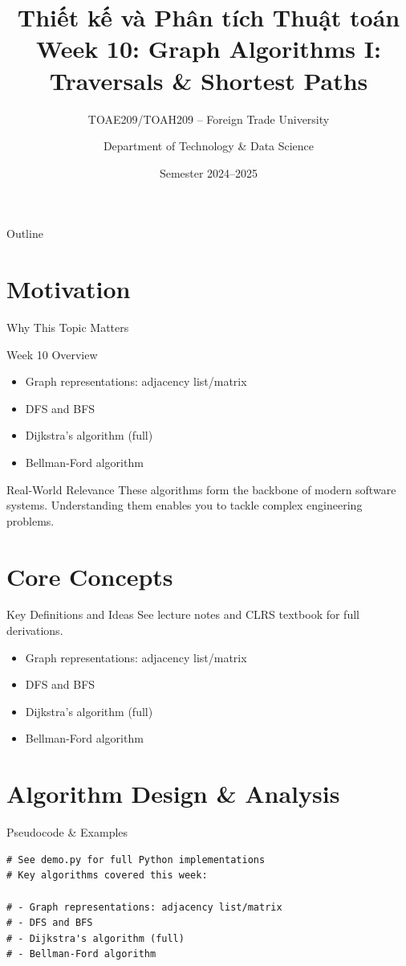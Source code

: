 \documentclass[aspectratio=169,xcolor=dvipsnames]{beamer}
\title[Algorithms -- Week 10]{\textbf{Thiết kế và Phân tích Thuật toán}\\
  \large Week 10: Graph Algorithms I: Traversals & Shortest Paths}
\subtitle{TOAE209/TOAH209 -- Foreign Trade University}
\author{Department of Technology \& Data Science}
\date{Semester 2024--2025}
\begin{document}
\begin{frame}\titlepage\end{frame}
\begin{frame}{Outline}\tableofcontents\end{frame}

\section{Motivation}
\begin{frame}{Why This Topic Matters}
  \begin{block}{Week 10 Overview}
    \begin{itemize}
    \item Graph representations: adjacency list/matrix
    \item DFS and BFS
    \item Dijkstra's algorithm (full)
    \item Bellman-Ford algorithm
    \end{itemize}
  \end{block}
  \begin{exampleblock}{Real-World Relevance}
    These algorithms form the backbone of modern software systems.
    Understanding them enables you to tackle complex engineering problems.
  \end{exampleblock}
\end{frame}

\section{Core Concepts}
\begin{frame}{Key Definitions and Ideas}
  See lecture notes and CLRS textbook for full derivations.
  \begin{itemize}
    \item Graph representations: adjacency list/matrix
    \item DFS and BFS
    \item Dijkstra's algorithm (full)
    \item Bellman-Ford algorithm
  \end{itemize}
\end{frame}

\section{Algorithm Design \& Analysis}
\begin{frame}[fragile]{Pseudocode \& Examples}
  \begin{lstlisting}
# See demo.py for full Python implementations
# Key algorithms covered this week:

# - Graph representations: adjacency list/matrix
# - DFS and BFS
# - Dijkstra's algorithm (full)
# - Bellman-Ford algorithm
  \end{lstlisting}
\end{frame}
\end{document}
